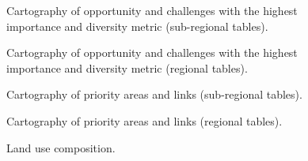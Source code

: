 {%

\begin{figure}[h!]
\caption{Cartography of opportunity and challenges  with the highest importance and diversity metric (sub-regional tables).}
\label{fig:reg_AC}
\end{figure}
\clearpage

\begin{figure}[h!]
\caption{Cartography of opportunity and challenges  with the highest importance and diversity metric (regional tables).}
\label{fig:trans_AC}
\end{figure}
\clearpage


\begin{figure}[h!]
\caption{Cartography of priority areas and links (sub-regional tables).}
\label{fig:reg}
\end{figure}
\clearpage

\begin{figure}[h!]
\caption{Cartography of priority areas and links (regional tables).}
\label{fig:trans}
\end{figure}
\clearpage


\begin{figure}[h!]
\caption{Land use composition.}
\label{fig:bar_chap2}
\end{figure}
\clearpage


}
